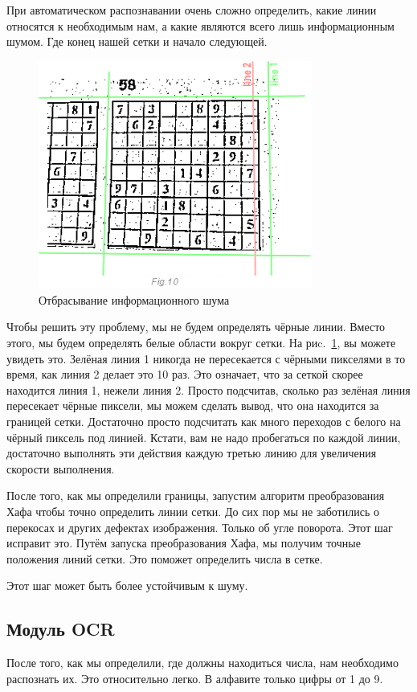 При автоматическом распознавании очень сложно определить, какие линии относятся к необходимым нам, а какие являются всего лишь информационным шумом. Где конец нашей сетки и начало следующей.

\begin{figure}[ht!]
  \centering
  \includegraphics[width=0.8\textwidth]{inc/raster/design2-9.png}
  \caption{Отбрасывание информационного шума}
  \label{fig:fig29}
\end{figure}

Чтобы решить эту проблему, мы не будем определять чёрные линии. Вместо этого, мы будем определять белые области вокруг сетки. На  риc.~\ref{fig:fig29}, вы можете увидеть это. Зелёная линия 1 никогда не пересекается с чёрными пикселями в то время, как линия 2 делает это 10 раз. Это означает, что за сеткой скорее находится линия 1, нежели линия 2. Просто подсчитав, сколько раз зелёная линия пересекает чёрные пиксели, мы можем сделать вывод, что она находится за границей сетки. Достаточно просто подсчитать как много переходов с белого на чёрный пиксель под линией. Кстати, вам не надо пробегаться по каждой линии, достаточно выполнять эти действия каждую третью линию для увеличения скорости выполнения.


После того, как мы определили границы, запустим алгоритм преобразования Хафа чтобы точно определить линии сетки. До сих пор мы не заботились о перекосах и других дефектах изображения. Только об угле поворота. Этот шаг исправит это. Путём запуска преобразования Хафа, мы получим точные положения линий сетки. Это поможет определить числа в сетке.

Этот шаг может быть более устойчивым к шуму.

\subsection{Модуль OCR}
После того, как мы определили, где должны находиться числа, нам необходимо распознать их. Это относительно легко. В алфавите только цифры от 1 до 9.

